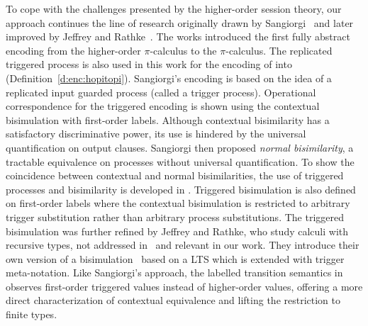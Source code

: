 To cope with the challenges presented by the higher-order
session theory, 
our approach continues the line of research 
originally drawn by Sangiorgi~\cite{San96H,SangiorgiD:expmpa}
and later improved by Jeffrey and Rathke~\cite{JeffreyR05}.
The works %
\cite{San96H,SangiorgiD:expmpa}
introduced the first fully abstract encoding from the higher-order 
$\pi$-calculus to the $\pi$-calculus. 
The replicated triggered process 
is also used in this work for the encoding of \HOp into \sessp (Definition~\ref{d:enc:hopitopi}).
Sangiorgi's encoding is based on the idea of a replicated input guarded process 
(called a trigger process). Operational correspondence for
the triggered encoding is shown using the contextual bisimulation
with first-order labels.
Although contextual bisimilarity has a satisfactory discriminative power,
its use is hindered by the universal quantification on output clauses.
Sangiorgi then proposed \emph{normal bisimilarity}, a tractable  equivalence 
on processes without universal quantification. 
To show the coincidence between contextual and normal bisimilarities, 
the use of triggered processes and bisimilarity is developed in \cite{San96H}.
Triggered bisimulation is also defined on first-order labels
where the contextual bisimulation is restricted to arbitrary
trigger substitution rather than arbitrary process substitutions.
The triggered bisimulation was further refined by Jeffrey and
Rathke, who study calculi with recursive types, not addressed in~\cite{San96H,SangiorgiD:expmpa} and
relevant in our work.
They introduce their own version of a
bisimulation~\cite{JeffreyR05}
based on a LTS which is extended with trigger meta-notation.
Like Sangiorgi's approach, the labelled transition semantics
in~\cite{JeffreyR05}
observes first-order triggered values instead of
higher-order values, offering a more direct characterization of contextual equivalence
and lifting the restriction to finite types.


